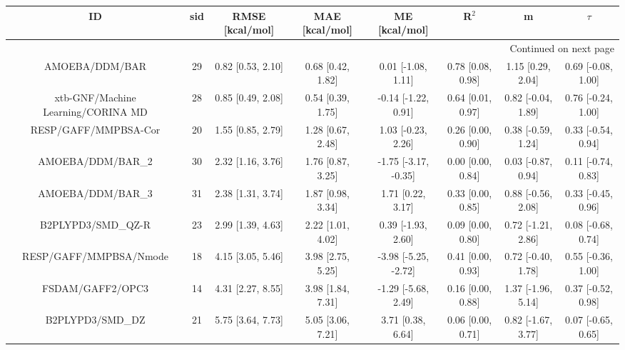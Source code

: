 \documentclass[8pt]{article}
\begin{document}
\begin{center}
\begin{footnotesize}
\begin{longtable}{|cccccccc|}
\toprule
                                 ID &   sid &      RMSE [kcal/mol] &       MAE [kcal/mol] &         ME [kcal/mol] &              R$^2$ &                   m &              $\tau$ \\
\midrule
\endhead
\midrule
\multicolumn{8}{r}{{Continued on next page}} \\
\midrule
\endfoot

\bottomrule
\endlastfoot
                     AMOEBA/DDM/BAR &    29 &    0.82 [0.53, 2.10] &    0.68 [0.42, 1.82] &    0.01 [-1.08, 1.11] &  0.78 [0.08, 0.98] &   1.15 [0.29, 2.04] &  0.69 [-0.08, 1.00] \\
 xtb-GNF/Machine Learning/CORINA MD &    28 &    0.85 [0.49, 2.08] &    0.54 [0.39, 1.75] &   -0.14 [-1.22, 0.91] &  0.64 [0.01, 0.97] &  0.82 [-0.04, 1.89] &  0.76 [-0.24, 1.00] \\
               RESP/GAFF/MMPBSA-Cor &    20 &    1.55 [0.85, 2.79] &    1.28 [0.67, 2.48] &    1.03 [-0.23, 2.26] &  0.26 [0.00, 0.90] &  0.38 [-0.59, 1.24] &  0.33 [-0.54, 0.94] \\
                  AMOEBA/DDM/BAR\_2 &    30 &    2.32 [1.16, 3.76] &    1.76 [0.87, 3.25] &  -1.75 [-3.17, -0.35] &  0.00 [0.00, 0.84] &  0.03 [-0.87, 0.94] &  0.11 [-0.74, 0.83] \\
                  AMOEBA/DDM/BAR\_3 &    31 &    2.38 [1.31, 3.74] &    1.87 [0.98, 3.34] &     1.71 [0.22, 3.17] &  0.33 [0.00, 0.85] &  0.88 [-0.56, 2.08] &  0.33 [-0.45, 0.96] \\
                 B2PLYPD3/SMD\_QZ-R &    23 &    2.99 [1.39, 4.63] &    2.22 [1.01, 4.02] &    0.39 [-1.93, 2.60] &  0.09 [0.00, 0.80] &  0.72 [-1.21, 2.86] &  0.08 [-0.68, 0.74] \\
             RESP/GAFF/MMPBSA/Nmode &    18 &    4.15 [3.05, 5.46] &    3.98 [2.75, 5.25] &  -3.98 [-5.25, -2.72] &  0.41 [0.00, 0.93] &  0.72 [-0.40, 1.78] &  0.55 [-0.36, 1.00] \\
                   FSDAM/GAFF2/OPC3 &    14 &    4.31 [2.27, 8.55] &    3.98 [1.84, 7.31] &   -1.29 [-5.68, 2.49] &  0.16 [0.00, 0.88] &  1.37 [-1.96, 5.14] &  0.37 [-0.52, 0.98] \\
                   B2PLYPD3/SMD\_DZ &    21 &    5.75 [3.64, 7.73] &    5.05 [3.06, 7.21] &     3.71 [0.38, 6.64] &  0.06 [0.00, 0.71] &  0.82 [-1.67, 3.77] &  0.07 [-0.65, 0.65] \\

\end{longtable}
\end{footnotesize}
\end{center}
\end{document}
